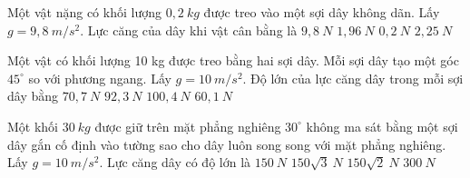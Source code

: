 \begin{ex}%
Một vật nặng có khối lượng $0,2\ kg$ được treo vào một sợi dây không dãn. Lấy $g=9,8\ m/s^2$. Lực căng của dây khi vật cân bằng là
\choice
{$9,8\ N$}
{\True $1,96\ N$}
{$0,2\ N$}
{$2,25\ N$}
 \end{ex}	
\begin{ex}%
Một vật có khối lượng 10 kg được treo bằng hai sợi dây. Mỗi sợi dây tạo  một góc $45^\circ$ so với phương ngang. Lấy $g=10 \ m / s^2$. Độ lớn của lực căng dây trong mỗi sợi dây bằng
\choice
{\True $70,7 \ N$}
{$92,3 \ N$}
{$100,4 \ N$}
{$60,1 \ N$}
 \end{ex}	
\begin{ex}%
Một khối $30\ kg$ được giữ trên mặt phẳng nghiêng $30^\circ$ không ma sát bằng một sợi dây gắn cố định vào tường sao cho dây luôn song song với mặt phẳng nghiêng. Lấy $g=10\ m/s^2$. Lực căng dây có độ lớn là
\choice
{\True $150 \ N$}
{$150 \sqrt{3} \ N$}
{$150 \sqrt{2} \ N$}
{$300 \ N$}
 \end{ex}	
